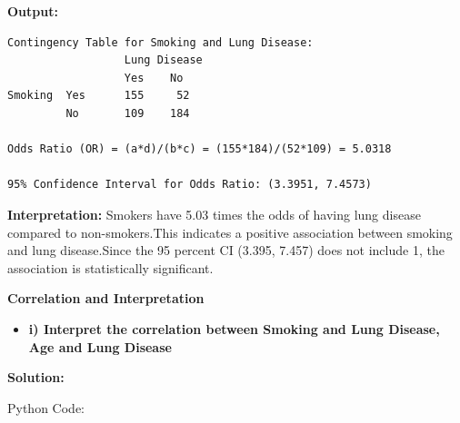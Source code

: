 \documentclass[12pt]{article}
\begin{document}
\textbf{Output:}

\vspace{0.3cm}

\begin{verbatim}
Contingency Table for Smoking and Lung Disease:
                  Lung Disease
                  Yes    No
Smoking  Yes      155     52
         No       109    184

Odds Ratio (OR) = (a*d)/(b*c) = (155*184)/(52*109) = 5.0318

95% Confidence Interval for Odds Ratio: (3.3951, 7.4573)

\end{verbatim}

\vspace{0.4cm}

\textbf{Interpretation:}
Smokers have 5.03 times the odds of having lung disease compared to non-smokers.This indicates a positive association between smoking and lung disease.Since the 95 percent CI (3.395, 7.457) does not include 1, the association is statistically significant.

\vspace{4cm}

{\large \textbf{Correlation and Interpretation}}

\vspace{0.3cm}

\begin{itemize}
    \item\textbf{i) Interpret the correlation between Smoking and Lung Disease, Age and Lung Disease}
\end{itemize}

{\large\textbf{Solution:}}

\vspace{0.1cm}

{\large{Python Code:}}

\vspace{0.2cm}
\end{document}
